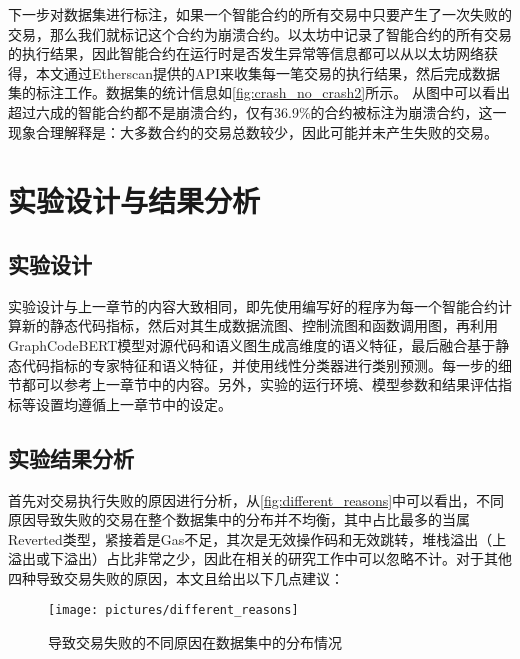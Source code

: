 下一步对数据集进行标注，如果一个智能合约的所有交易中只要产生了一次失败的交易，那么我们就标记这个合约为崩溃合约。以太坊中记录了智能合约的所有交易的执行结果，因此智能合约在运行时是否发生异常等信息都可以从以太坊网络获得，本文通过Etherscan提供的API来收集每一笔交易的执行结果，然后完成数据集的标注工作。数据集的统计信息如\autoref{fig:crash_no_crash2}所示。
从图中可以看出超过六成的智能合约都不是崩溃合约，仅有36.9\%的合约被标注为崩溃合约，这一现象合理解释是：大多数合约的交易总数较少，因此可能并未产生失败的交易。










\section{实验设计与结果分析}
\label{sec:实验设计与结果分析2}

\subsection{实验设计}
\label{sec:实验设计}
实验设计与上一章节的内容大致相同，即先使用编写好的程序为每一个智能合约计算新的静态代码指标，然后对其生成数据流图、控制流图和函数调用图，再利用GraphCodeBERT模型对源代码和语义图生成高维度的语义特征，最后融合基于静态代码指标的专家特征和语义特征，并使用线性分类器进行类别预测。每一步的细节都可以参考上一章节中的内容。另外，实验的运行环境、模型参数和结果评估指标等设置均遵循上一章节中的设定。
\subsection{实验结果分析}
\label{sec:实验结果分析2}
首先对交易执行失败的原因进行分析，从\autoref{fig:different_reasons}中可以看出，不同原因导致失败的交易在整个数据集中的分布并不均衡，其中占比最多的当属Reverted类型，紧接着是Gas不足，其次是无效操作码和无效跳转，堆栈溢出（上溢出或下溢出）占比非常之少，因此在相关的研究工作中可以忽略不计。对于其他四种导致交易失败的原因，本文且给出以下几点建议：
\begin{figure}[htbp]
    \centering
    \texttt{[image: pictures/different\_reasons]}
    \caption{\label{fig:different_reasons}导致交易失败的不同原因在数据集中的分布情况}
\end{figure}

